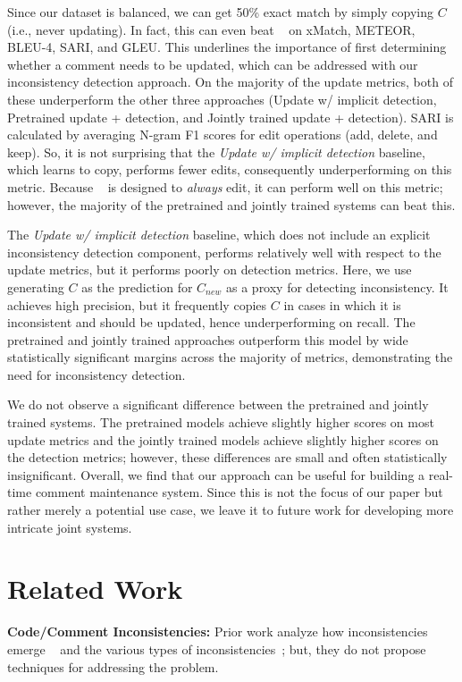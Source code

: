 \documentclass[letterpaper]{article} %
\newcommand{\Comment}{$C$}
\newcommand{\NewComment}{$C_{new}$}
\newcommand{\UpdateCopy}{Update w/ implicit detection}
\newcommand{\Pretrained}{Pretrained update + detection}
\newcommand{\JointlyTrained}{Jointly trained update + detection}
\begin{document}
Since our dataset is balanced, we can get 50\% exact match by simply copying \Comment{} (i.e., never updating). In fact, this can even beat \citeauthor{panthaplackel2020update}~ on xMatch, METEOR, BLEU-4, SARI, and GLEU. This underlines the importance of first determining whether a comment needs to be updated, which can be addressed with our inconsistency detection approach. On the  majority of the update metrics, both of these underperform the other three approaches (\UpdateCopy{}, \Pretrained{}, and \JointlyTrained{}). SARI is calculated by averaging N-gram F1 scores for edit operations (add, delete, and keep). So, it is not surprising that the \textit{\UpdateCopy{}} baseline, which learns to copy, performs fewer edits, consequently underperforming on this metric. Because \citeauthor{panthaplackel2020update}~ is designed to \textit{always} edit, it can perform well on this metric; however, the majority of the pretrained and jointly trained systems can beat this.

The \textit{\UpdateCopy{}} baseline, which does not include an explicit inconsistency detection component, performs relatively well with respect to the update metrics, but it performs poorly on detection metrics. Here, we use generating \Comment{} as the prediction for \NewComment{} as a proxy for detecting inconsistency. It achieves high precision, but it frequently copies \Comment{} in cases in which it is inconsistent and should be updated, hence underperforming on recall. The pretrained and jointly trained approaches outperform this model by wide statistically significant margins across the majority of metrics, demonstrating the need for inconsistency detection. 

We do not observe a significant difference between the pretrained and jointly trained systems. The pretrained models achieve slightly higher scores on most update metrics and the jointly trained models achieve slightly higher scores on the detection metrics; however, these differences are small and often statistically insignificant. Overall, we find that our approach can be useful for building a real-time comment maintenance system. Since this is not the focus of our paper but rather merely a potential use case,  we leave it to future work for developing more intricate joint systems.




\section{Related Work}
\noindent\textbf{Code/Comment Inconsistencies:}
Prior work analyze how inconsistencies emerge ~\cite{FluriAnalysis,JiangEvolution,IbrahimBugs,fluri:coevolve} and the various types of inconsistencies~\cite{WenLargeStudy}; but, they do not propose techniques for addressing the problem.
\end{document}
